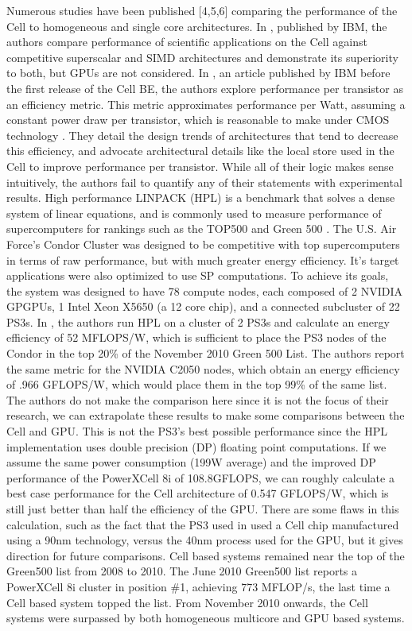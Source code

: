\documentclass{sig-alternate-05-2015}
\begin{document}
Numerous studies have been published [4,5,6] comparing the performance of the Cell to homogeneous and single core architectures. In \cite{chen2007cell}, published by IBM, the authors compare performance of scientific applications on the Cell against competitive superscalar and SIMD architectures and demonstrate its superiority to both, but GPUs are not considered.
In \cite{hofstee2005power}, an article published by IBM before the first release of the Cell BE, the authors explore performance per transistor as an efficiency metric. This metric approximates performance per Watt, assuming a constant power draw per transistor, which is reasonable to make under CMOS technology \cite{hofstee2005power}. They detail the design trends of architectures that tend to decrease this efficiency, and advocate architectural details like the local store used in the Cell to improve performance per transistor. While all of their logic makes sense intuitively, the authors fail to quantify any of their statements with experimental results.
High performance LINPACK (HPL) is a benchmark that solves a dense system of linear equations, and is commonly used to measure performance of supercomputers for rankings such as the TOP500 \cite{about_hpl} and Green 500 \cite{green500}. The U.S. Air Force's Condor Cluster was designed to be competitive with top supercomputers in terms of raw performance, but with much greater energy efficiency. It's target applications were also optimized to use SP computations. To achieve its goals, the system was designed to have 78 compute nodes, each composed of 2 NVIDIA GPGPUs, 1 Intel Xeon X5650 (a 12 core chip), and a connected subcluster of 22 PS3s. In \cite{luley2011energy}, the authors run HPL on a cluster of 2 PS3s and calculate an energy efficiency of 52 MFLOPS/W, which is sufficient to place the PS3 nodes of the Condor in the top 20\% of the November 2010 Green 500 List. The authors report the same metric for the NVIDIA C2050 nodes, which obtain an energy efficiency of .966 GFLOPS/W, which would place them in the top 99\% of the same list. The authors do not make the comparison here since it is not the focus of their research, we can extrapolate these results to make some comparisons between the Cell and GPU. This is not the PS3's best possible performance since the HPL implementation uses double precision (DP) floating point computations. If we assume the same power consumption (199W average) and the improved DP performance of the PowerXCell 8i of 108.8GFLOPS, we can roughly calculate a best case performance for the Cell architecture of 0.547 GFLOPS/W, which is still just better than half the efficiency of the GPU. There are some flaws in this calculation, such as the fact that the PS3 used in \cite{luley2011energy} used a Cell chip manufactured using a 90nm technology, versus the 40nm \cite{techpowerup} process used for the GPU, but it gives direction for future comparisons.
Cell based systems remained near the top of the Green500 list from 2008 to 2010. The June 2010 Green500 list \cite{green500_062010} reports a PowerXCell 8i cluster in position \#1, achieving 773 MFLOP/s, the last time a Cell based system topped the list. From November 2010 onwards, the Cell systems were surpassed by both homogeneous multicore and GPU based systems. 
\end{document}

